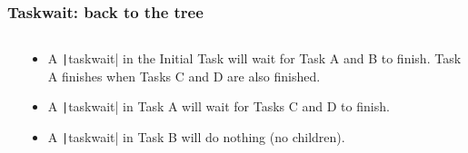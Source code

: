 \documentclass{beamer}
\begin{document}
\begin{frame}
\frametitle{Taskwait: back to the tree}

\begin{columns}
\begin{column}{0.5\textwidth}
\end{column}

\begin{column}{0.5\textwidth}
\begin{itemize}
  \item A \texttt|taskwait| in the Initial Task will wait for Task A and B to finish. Task A finishes when Tasks C and D are also finished.
  \item A \texttt|taskwait| in Task A will wait for Tasks C and D to finish.
  \item A \texttt|taskwait| in Task B will do nothing (no children).
\end{itemize}
\end{column}
\end{columns}
\end{frame}
\end{document}
